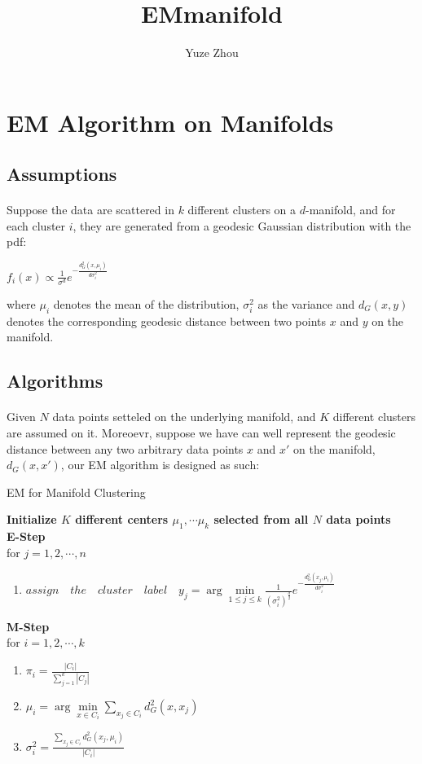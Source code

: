 \documentclass{article}
\title{EMmanifold}
\author{Yuze Zhou}
\begin{document}
\section{EM Algorithm on Manifolds}
\subsection{Assumptions}
\paragraph{}Suppose the data are scattered in $k$ different clusters on a $d$-manifold, and for each cluster $i$, they are generated from a geodesic Gaussian distribution with the pdf:\\
\begin{center}
$f_{i}(x) \propto \frac{1}{\sigma^{d}}e^{-\frac{d_{G}^{2}(x,\mu_{i})}{d\sigma_{i}^{2}}}$
\end{center}
where $\mu_{i}$ denotes the mean of the distribution, $\sigma_{i}^{2}$ as the variance and $d_{G}(x,y)$ denotes the corresponding geodesic distance between two points $x$ and $y$ on the manifold.
\subsection{Algorithms}
\paragraph{}Given $N$ data points setteled on the underlying manifold, and $K$ different clusters are assumed on it. Moreoevr, suppose we have can well represent the geodesic distance between any two arbitrary data points $x$ and $x'$ on the manifold, $d_{G}(x,x')$, our EM algorithm is designed as such:\\
\begin{center}
\begin{algorithm}[H]
\caption{EM for Manifold Clustering}
\textbf{Initialize $K$ different centers $\mu_{1}, \cdots \mu_{k}$ selected from all $N$ data points}\\
\textbf{E-Step}\\
for $j=1,2,\cdots,n$\\
\begin{enumerate}
\item $assign \quad the \quad cluster \quad label \quad y_{j} = \arg\min\limits_{1 \leq j \leq k} \frac{1}{(\sigma_{i}^{2})^{\frac{d}{2}}} e^{-\frac{d_{G}^{2}(x_{j},\mu_{i})}{d\sigma_{i}^{2}}}$
\end{enumerate}
\textbf{M-Step}\\
for $i=1,2,\cdots,k$\\
\begin{enumerate}
  \item $\pi_{i} = \frac{|C_{i}|}{\sum\limits_{j=1}^{k}|C_{j}|}$
  \item $\mu_{i} = \arg\min\limits_{x \in C_{i}} \sum\limits_{x_{j} \in C_{i}}d_{G}^{2}(x,x_{j})$
  \item $\sigma_{i}^{2} = \frac{\sum\limits_{x_{j} \in C_{i}}d_{G}^{2}(x_{j},\mu_{i})}{|C_{i}|}$
\end{enumerate}
\end{algorithm}
\end{center}
\end{document}

